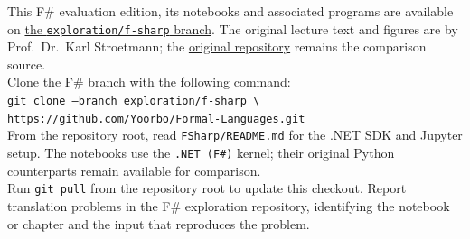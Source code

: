 This F\# evaluation edition, its notebooks and associated programs are available on \href{https://github.com/Yoorbo/Formal-Languages/tree/exploration/f-sharp}{the \texttt{exploration/f-sharp} branch}.
The original lecture text and figures are by Prof.~Dr.~Karl Stroetmann; the \href{https://github.com/karlstroetmann/Formal-Languages}{original repository} remains the comparison source.
\\[0.2cm] Clone the F\# branch with the following command: \\[0.2cm] \textcolor{amethyst}{\texttt{git clone --branch exploration/f-sharp \textbackslash}} \\ \hspace*{0.5cm}\textcolor{amethyst}{\texttt{https://github.com/Yoorbo/Formal-Languages.git}} \\[0.2cm] From the repository root, read \texttt{FSharp/README.md} for the .NET SDK and Jupyter setup.
The notebooks use the \texttt{.NET (F\#)} kernel; their original Python counterparts remain available for comparison.
\\[0.2cm] Run \texttt{git pull} from the repository root to update this checkout.
Report translation problems in the F\# exploration repository, identifying the notebook or chapter and the input that reproduces the problem.
